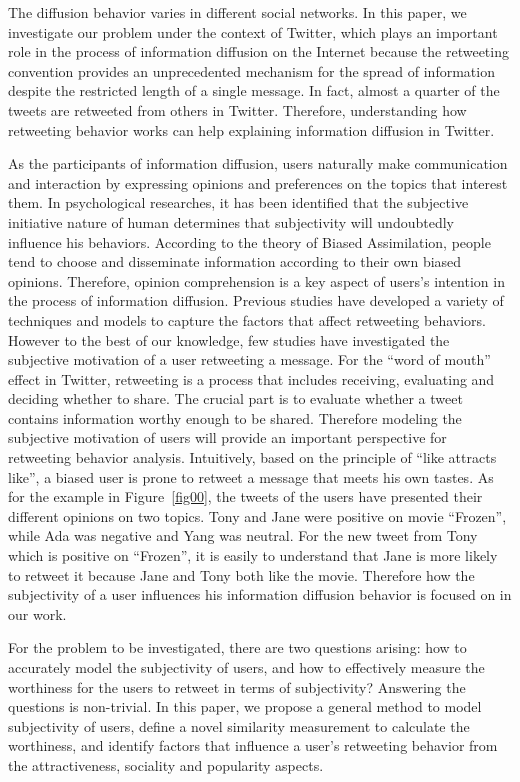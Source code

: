 \documentclass[letterpaper]{article}
\begin{document}
The diffusion behavior varies in different social networks. In this paper, we investigate our problem under the context of Twitter, which plays an important role in the process of information diffusion on the Internet because the retweeting convention provides an unprecedented mechanism for the spread of information despite the restricted length of a single message. 
In fact, almost a quarter of the tweets are retweeted from others in Twitter\cite{yang2010understanding}. Therefore, understanding how retweeting behavior works can help explaining information diffusion in Twitter. 

As the participants of information diffusion, users naturally make communication and interaction by expressing opinions and preferences on the topics that interest them. In psychological researches, it has been identified that the subjective initiative nature of human determines that subjectivity will undoubtedly influence his behaviors\cite{moore2008awareness}. According to the theory of Biased Assimilation, people tend to choose and disseminate information according to their own biased opinions\cite{Hyman2000}. Therefore, opinion comprehension is a key aspect of users's intention in the process of information diffusion. 
Previous studies have developed a variety of techniques and models to capture the factors that affect retweeting behaviors\cite{macskassy2011people,feng2013retweet}. However to the best of our knowledge, few studies have investigated the subjective motivation of a user retweeting a message. 
For the  ``word of mouth'' effect in Twitter, retweeting is a process that includes receiving, evaluating and deciding whether to share. The crucial part is to evaluate whether a tweet contains information worthy enough to be shared.  
Therefore modeling the subjective motivation of users will provide an important perspective for retweeting behavior analysis. 
Intuitively, based on the principle of ``like attracts like'', a biased user is prone to retweet a message that meets his own tastes. As for the example in Figure~\ref{fig00}, the tweets of the users have presented their different opinions on two topics. Tony and Jane were positive on movie ``Frozen'', while Ada was negative and Yang was neutral. For the new tweet from Tony which is positive on ``Frozen'', it is easily to understand that Jane is more likely to retweet it because Jane and Tony both like the movie. Therefore how the subjectivity of a user influences his information diffusion behavior is focused on in our work.

For the problem to be investigated, there are two questions arising: how to accurately model the subjectivity of users, and how to effectively measure the worthiness for the users to retweet in terms of subjectivity? 
Answering the questions is non-trivial. 
In this paper, we propose a general method to model subjectivity of users, define a novel similarity measurement to calculate the worthiness,  and identify factors that influence a user's retweeting behavior from the attractiveness, sociality and popularity aspects. 
\end{document}
